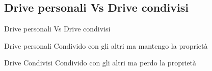 \subsection{Drive personali Vs Drive condivisi}
\begin{frame}{Drive personali Vs Drive condivisi}
	\begin{alertblock}{Drive personali}
		Condivido con gli altri ma mantengo la proprietà
	\end{alertblock}
	\begin{block}{Drive Condivisi}
		Condivido con gli altri ma perdo la proprietà
	\end{block}
\end{frame}